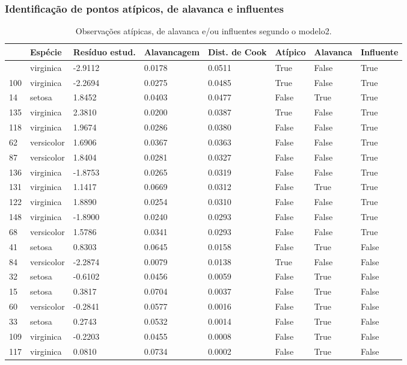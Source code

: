 \documentclass[a4paper]{_extensions/modeloufcg/modeloUFCG}
\begin{document}
\subsubsection{Identificação de pontos atípicos, de alavanca e
influentes}\label{identificauxe7uxe3o-de-pontos-atuxedpicos-de-alavanca-e-influentes}

{

\begin{longtable}[]{@{}llllllll@{}}

\caption{\label{tbl-influencia}Observações atípicas, de alavanca e/ou
influentes segundo o modelo2.}

\tabularnewline

\toprule\noalign{}
& Espécie & Resíduo estud. & Alavancagem & Dist. de Cook & Atípico &
Alavanca & Influente \\
\midrule\noalign{}
\endhead
\bottomrule\noalign{}
\endlastfoot
106 & virginica & -2.9112 & 0.0178 & 0.0511 & True & False & True \\
100 & virginica & -2.2694 & 0.0275 & 0.0485 & True & False & True \\
14 & setosa & 1.8452 & 0.0403 & 0.0477 & False & True & True \\
135 & virginica & 2.3810 & 0.0200 & 0.0387 & True & False & True \\
118 & virginica & 1.9674 & 0.0286 & 0.0380 & False & False & True \\
62 & versicolor & 1.6906 & 0.0367 & 0.0363 & False & False & True \\
87 & versicolor & 1.8404 & 0.0281 & 0.0327 & False & False & True \\
136 & virginica & -1.8753 & 0.0265 & 0.0319 & False & False & True \\
131 & virginica & 1.1417 & 0.0669 & 0.0312 & False & True & True \\
122 & virginica & 1.8890 & 0.0254 & 0.0310 & False & False & True \\
148 & virginica & -1.8900 & 0.0240 & 0.0293 & False & False & True \\
68 & versicolor & 1.5786 & 0.0341 & 0.0293 & False & False & True \\
41 & setosa & 0.8303 & 0.0645 & 0.0158 & False & True & False \\
84 & versicolor & -2.2874 & 0.0079 & 0.0138 & True & False & False \\
32 & setosa & -0.6102 & 0.0456 & 0.0059 & False & True & False \\
15 & setosa & 0.3817 & 0.0704 & 0.0037 & False & True & False \\
60 & versicolor & -0.2841 & 0.0577 & 0.0016 & False & True & False \\
33 & setosa & 0.2743 & 0.0532 & 0.0014 & False & True & False \\
109 & virginica & -0.2203 & 0.0455 & 0.0008 & False & True & False \\
117 & virginica & 0.0810 & 0.0734 & 0.0002 & False & True & False \\

\end{longtable}

}
\end{document}
